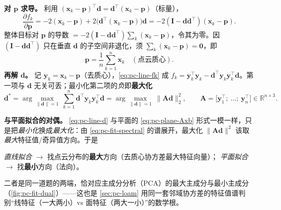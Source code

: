 \begin{derivation}
\textbf{对 $\mathbf{p}$ 求导。} 利用 $(\mathbf{x}_k-\mathbf{p})^\top\mathbf{d}=\mathbf{d}^\top(\mathbf{x}_k-\mathbf{p})$（标量），
\begin{equation}
  \frac{\partial f_k}{\partial\mathbf{p}}
  =-2(\mathbf{x}_k-\mathbf{p})+2\big(\mathbf{d}^\top(\mathbf{x}_k-\mathbf{p})\big)\mathbf{d}
  =-2(\mathbf{I}-\mathbf{d}\mathbf{d}^\top)(\mathbf{x}_k-\mathbf{p}).
  \label{eq:pc-line-dfdp}
\end{equation}
整体目标对 $\mathbf{p}$ 的导数 $=-2(\mathbf{I}-\mathbf{d}\mathbf{d}^\top)\sum_k(\mathbf{x}_k-\mathbf{p})$，令其为零。因 $(\mathbf{I}-\mathbf{d}\mathbf{d}^\top)$ 只在垂直 $\mathbf{d}$ 的子空间非退化，须 $\sum_k(\mathbf{x}_k-\mathbf{p})=\mathbf{0}$，即
\begin{equation}
  \mathbf{p}=\frac{1}{n}\sum_{k=1}^{n}\mathbf{x}_k\quad(\text{点云质心}).
  \label{eq:pc-line-p}
\end{equation}
\textbf{再解 $\mathbf{d}$。} 记 $\mathbf{y}_k=\mathbf{x}_k-\mathbf{p}$（去质心），\cref{eq:pc-line-fk} 成 $f_k=\mathbf{y}_k^\top\mathbf{y}_k-\mathbf{d}^\top\mathbf{y}_k\mathbf{y}_k^\top\mathbf{d}$。第一项与 $\mathbf{d}$ 无关可丢；最小化第二项的\emph{负}即\textbf{最大化}
\begin{equation}
  \mathbf{d}^\ast=\arg\max_{\|\mathbf{d}\|=1}\ \sum_{k=1}^{n}\mathbf{d}^\top\mathbf{y}_k\mathbf{y}_k^\top\mathbf{d}
  =\arg\max_{\|\mathbf{d}\|=1}\ \|\mathbf{A}\mathbf{d}\|_2^2,
  \qquad \mathbf{A}=\big[\mathbf{y}_1^\top;\ \dots;\ \mathbf{y}_n^\top\big]\in\mathbb{R}^{n\times3}.
  \label{eq:pc-line-d}
\end{equation}
\end{derivation}

\noindent\textbf{与平面拟合的对偶。} \cref{eq:pc-line-d} 与平面的 \cref{eq:pc-plane-Axb} 形式一模一样，只是把\emph{最小化}换成\emph{最大化}：由 \cref{eq:pc-fit-spectral} 的谱展开，最大化 $\|\mathbf{A}\mathbf{d}\|^2$ 该取\emph{最大}特征值/奇异值方向。于是
\begin{center}\small
\emph{直线拟合} $\to$ 找点云分布的\textbf{最大}方向（去质心协方差最大特征向量）；\quad
\emph{平面拟合} $\to$ 找\textbf{最小}方向（法向）。
\end{center}
二者是同一道题的两端，恰对应主成分分析（PCA）的最大主成分与最小主成分（\cref{fig:pc-fit-dual}）——这也是 \cref{sec:pc-loam} 用同一套邻域协方差的特征值谱判别“线特征（一大两小）vs 面特征（两大一小）”的数学根。

